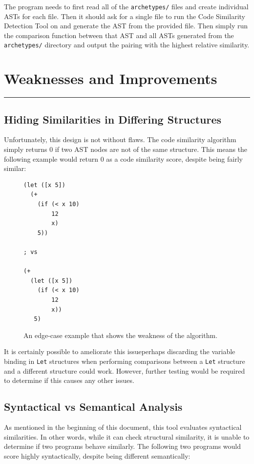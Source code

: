 \documentclass[12pt]{article}
\newcommand{\key}[1]{\texttt{#1}}
\newcommand{\usection}[1]{\section{#1}\hrule\hfill}
\begin{document}
\hfill

The program needs to first read all of the \key{archetypes/} files and create individual ASTs for each file. Then it should ask for a single file to run the Code Similarity Detection Tool on and generate the AST from the provided file. Then simply run the comparison function between that AST and all ASTs generated from the \key{archetypes/} directory and output the pairing with the highest relative similarity.

\usection{Weaknesses and Improvements}

\subsection{Hiding Similarities in Differing Structures}
Unfortunately, this design is not without flaws. The code similarity algorithm simply returns 0 if two AST nodes are not of the same structure. This means the following example would return 0 as a code similarity score, despite being fairly similar:

\begin{figure}[H]
  \begin{mdframed}
    \begin{lstlisting}[escapechar=\%]
(let ([x 5])
  (+
    (if (< x 10)
        12
        x)
    5))

; vs

(+
  (let ([x 5])
    (if (< x 10)
        12
        x))
   5)
    \end{lstlisting}
  \end{mdframed}
  \caption{An edge-case example that shows the weakness of the algorithm.}
  \label{weak-example}
\end{figure}

It is certainly possible to ameliorate this issue\textemdash perhaps discarding the variable binding in \key{Let} structures when performing comparisons between a \key{Let} structure and a different structure could work. However, further testing would be required to determine if this causes any other issues.

\subsection{Syntactical vs Semantical Analysis}

As mentioned in the beginning of this document, this tool evaluates syntactical similarities. In other words, while it can check structural similarity, it is unable to determine if two programs behave similarly. The following two programs would score highly syntactically, despite being different semantically:
\end{document}
